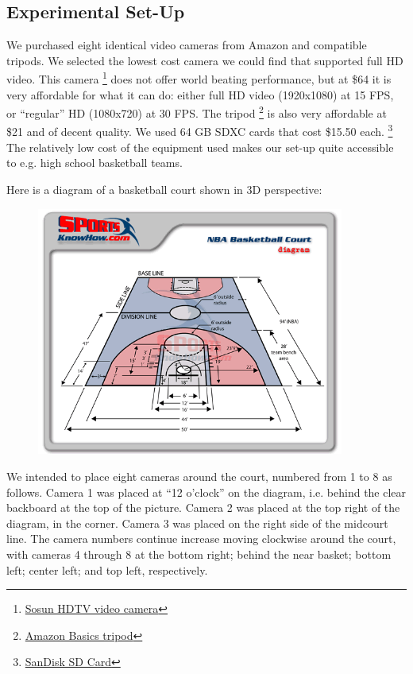 \documentclass{article}
\begin{document}
\subsection{Experimental Set-Up}
We purchased eight identical video cameras from Amazon and compatible tripods.
We selected the lowest cost camera we could find that supported full HD video.
This camera
\footnote{
\href{https://www.amazon.com/Camcorder-SOSUN-Rotatable-Batteries-301S-Plus/dp/B07CZ3WXYX/ref=sr_1_1?ie=UTF8&qid=1545104673&sr=8-1&keywords=sosun}
{Sosun HDTV video camera}}
does not offer world beating performance, but at \$64 it is very affordable for what it can do: 
either full HD video (1920x1080) at 15 FPS, or ``regular'' HD (1080x720) at 30 FPS.
The tripod 
\footnote{\href{https://www.amazon.com/gp/product/B005KP473Q/ref=oh_aui_detailpage_o04_s01?ie=UTF8&psc=1}
{Amazon Basics tripod}}
is also very affordable at \$21 and of decent quality.
We used 64 GB SDXC cards that cost \$15.50 each.
\footnote{
\href{https://www.amazon.com/gp/product/B00CXI1EI4/ref=oh_aui_detailpage_o06_s00?ie=UTF8&psc=1}
{SanDisk SD Card}}
The relatively low cost of the equipment used makes our set-up quite accessible to e.g. high school basketball teams.

Here is a diagram of a basketball court shown in 3D perspective:
\begin{figure}[H]
\centering
\includegraphics[width=0.90\textwidth]{NBA-court-diagram.png}
\end{figure}

We intended to place eight cameras around the court, numbered from 1 to 8 as follows.  
Camera 1 was placed at ``12 o'clock'' on the diagram, i.e. behind the clear backboard at the top of the picture.
Camera 2 was placed at the top right of the diagram, in the corner.
Camera 3 was placed on the right side of the midcourt line.
The camera numbers continue increase moving clockwise around the court, with cameras 4 through 8 at
the bottom right; behind the near basket; bottom left; center left; and top left, respectively.
\end{document}
